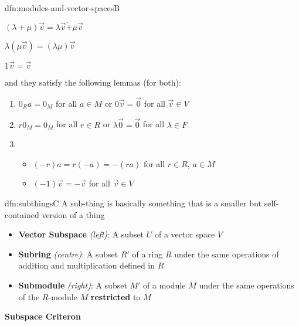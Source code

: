 \documentclass[landscape, 8pt]{extarticle}
\begin{document}
\begin{multicols}{3}
\begin{dfn}{dfn:modules-and-vector-spaces}{B}
\begin{multicols}{3}
            $(\lambda + \mu)\vec{v} = \lambda \vec{v} \dot{+} \mu \vec{v}$

            $\lambda (\mu \vec{v}) = (\lambda \mu) \vec{v}$

            $1\vec{v} = \vec{v}$
    \end{multicols}


    and they satisfy the following lemmas (for both):
    \begin{enumerate}
        \setlength\itemsep{0em}
        \item $0_{R} a = 0_{M}$ for all $a\in M$ \quad or \quad $0 \vec{v} = \vec{0}$ for all $\vec{v} \in V$
        \item $r 0_{M} = 0_{M}$ for all $r\in R$ \quad or \quad $\lambda \vec{0} = \vec{0}$ for all $\lambda\in F$
        \item \begin{itemize}[leftmargin=*]
            \setlength\itemsep{0em}
            \item $(-r)a = r(-a) = -(ra)$ for all $r\in R$, $a\in M$
            \item $(-1)\vec{v} = -\vec{v}$ for all $\vec{v}\in V$
        \end{itemize}
    \end{enumerate}
\end{dfn}




\begin{dfn}{dfn:subthings}{C}
    A sub-thing is basically something that is a smaller but self-contained version of a thing

    \vspace{-5pt}
    \begin{itemize}
        \setlength\itemsep{0em}
        \item \textbf{Vector Subspace} \textit{(left)}: A subset $U$ of a vector space $V$
        \item \textbf{Subring} \textit{(centre)}: A subset $R'$ of a ring $R$ under the same operations of addition and multiplication defined in $R$
        \item \textbf{Submodule} \textit{(right)}: A subset $M'$ of a module $M$ under the same operations of the $R$-module $M$ \textbf{restricted} to $M$
    \end{itemize}

    \vspace{-20pt}
    \setlength{\columnseprule}{0.5pt}
    \begin{multicols}{3}
        \textbf{Subspace Criteron}


\end{multicols}
\end{dfn}
\end{multicols}
\end{document}

